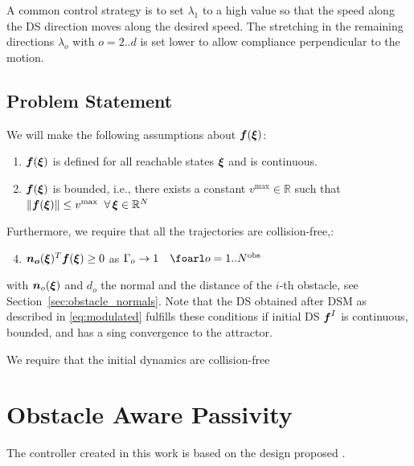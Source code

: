 \documentclass[conference]{IEEEtran}
\begin{document}
A common control strategy is to set $\lambda_1$ to a high value so that the speed along the DS direction moves along the desired speed. The stretching in the remaining directions $\lambda_o$ with $o = 2 .. d$ is set lower to allow compliance perpendicular to the motion. 


\subsection{Problem Statement}
We will make the following assumptions about $\boldsymbol{f}(\boldsymbol{\xi})$:
\begin{enumerate}
    \item $ \boldsymbol{f}(\boldsymbol{\xi})$ is defined for all reachable states $\boldsymbol{\xi}$ and is continuous.
    \item $\boldsymbol{f}(\boldsymbol{\xi})$ is bounded, i.e., there exists a constant $v^{\mathrm{max}} \in \mathbb{R}$ such that $\| \boldsymbol{f}(\boldsymbol{\xi}) \| \leq v^{\mathrm{max}} \;\; \forall \, \boldsymbol{\xi} \in \mathbb{R}^N$
\end{enumerate}

Furthermore, we require that all the trajectories are collision-free,: 
\begin{enumerate}
  \setcounter{enumi}{3}
  \item $\boldsymbol{n_o}(\boldsymbol{\xi})^T \boldsymbol{f}(\boldsymbol{\xi}) \geq 0$ as $\Gamma_o \rightarrow 1 
  \quad \foarl o = 1 .. N^{\mathrm{obs}}$
\end{enumerate}
with $\boldsymbol{n}_o (\boldsymbol{\xi})$ and $d_o$ the normal and the distance of the $i$-th obstacle, see Section~\ref{sec:obstacle_normals}. 
Note that the DS obtained after DSM as described in \eqref{eq:modulated} fulfills these conditions if initial DS $\boldsymbol{f}^I$ is continuous, bounded, and has a sing convergence to the attractor.

We require that the initial dynamics are collision-free


\section{Obstacle Aware Passivity} \label{sec:obstacle_aware_passivity}
The controller created in this work is based on the design proposed \cite{takegaki1981new,  kronander2015passive}.
\end{document}
